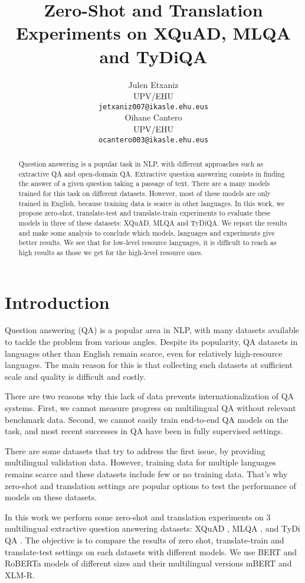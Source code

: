 \documentclass[11pt]{article}
\title{Zero-Shot and Translation Experiments on XQuAD, MLQA and TyDiQA}
\author{Julen Etxaniz \\
  UPV/EHU \\
  \texttt{jetxaniz007@ikasle.ehu.eus} \\\And
  Oihane Cantero \\
  UPV/EHU \\
  \texttt{ocantero003@ikasle.ehu.eus}}
\begin{document}
\maketitle
\begin{abstract}

Question answering is a popular task in NLP, with different approaches such as extractive QA and open-domain QA. Extractive question answering consists in finding the answer of a given question taking a passage of text. There are a many models trained for this task on different datasets. However, most of these models are only trained in English, because training data is scarce in other languages. In this work, we propose zero-shot, translate-test and translate-train experiments to evaluate these models in three of these datasets: XQuAD, MLQA and TyDiQA. We report the results and make some analysis to conclude which models, languages and experiments give better results. We see that for low-level resource languages, it is difficult to reach as high results as those we get for the high-level resource ones.

\end{abstract}

\section{Introduction}

Question answering (QA) is a popular area in NLP, with many datasets available to tackle the problem from various angles. Despite its popularity, QA datasets in languages other than English remain scarce, even for relatively high-resource languages. The main reason for this is that collecting such datasets at sufficient scale and quality is difficult and costly.

There are two reasons why this lack of data prevents internationalization of QA systems. First, we cannot measure progress on multilingual QA without relevant benchmark data. Second, we cannot easily train end-to-end QA models on the task, and most recent successes in QA have been in fully supervised settings.

There are some datasets that try to address the first issue, by providing multilingual validation data. However, training data for multiple languages remains scarce and these datasets include few or no training data. That's why zero-shot and translation settings are popular options to test the performance of models on these datasets.

In this work we perform some zero-shot and translation experiments on 3 multilingual extractive question answering datasets: XQuAD \cite{Artetxe:etal:2019}, MLQA \cite{lewis2019mlqa}, and TyDi QA \cite{tydiqa}. The objective is to compare the results of zero shot, translate-train and translate-test settings on each datasets with different models. We use BERT and RoBERTa models of different sizes and their multilingual versions mBERT and XLM-R.
\end{document}
